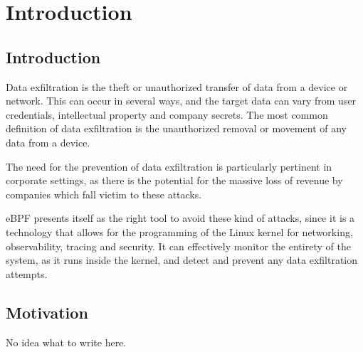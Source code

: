 \chapter{Introduction}
\label{chap:int}


\section{Introduction}

Data exfiltration is the theft or unauthorized transfer of data from a device or network. This can occur in several ways, and the target data can vary from user credentials, intellectual property and company secrets.
The most common definition of data exfiltration is the unauthorized removal or movement of any data from a device.

The need for the prevention of data exfiltration is particularly pertinent in corporate settings, as there is the potential for the massive loss of revenue by companies which fall victim to these attacks. 

eBPF presents itself as the right tool to avoid these kind of attacks, since it is a technology that allows for the programming of the Linux kernel for networking, observability, tracing and security. It can effectively monitor the entirety of the system, as it runs inside the kernel, and detect and prevent any data exfiltration attempts.

\section{Motivation}

No idea what to write here.

